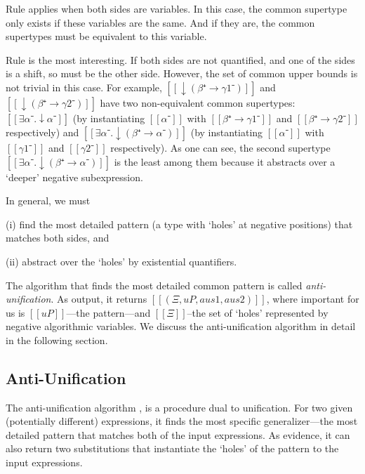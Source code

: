  Rule  applies when 
 both sides are variables. In this case,
 the common supertype only exists if these variables are 
 the same. And if they are, the common supertypes
 must be equivalent to this variable.

Rule  is the most 
interesting. If both sides are not quantified, and one of the sides is 
a shift, so must be the other side. 
However, the set of common upper bounds is not trivial in this case.
For example, $[[↓(β⁺ → γ1⁻)]]$ and $[[↓(β⁺ → γ2⁻)]]$ have
two non-equivalent common supertypes: 
$[[∃α⁻.↓α⁻]]$ 
(by instantiating $[[α⁻]]$ with $[[β⁺ → γ1⁻]]$ and $[[β⁺ → γ2⁻]]$ respectively)
and 
$[[∃α⁻.↓(β⁺ → α⁻)]]$ 
(by instantiating $[[α⁻]]$ with $[[γ1⁻]]$ and $[[γ2⁻]]$ respectively).
As one can see, the second supertype $[[∃α⁻.↓(β⁺ → α⁻)]]$ is the least among them
because it abstracts over a `deeper' negative subexpression.

In general, we must 
\begin{itemize*}
  \item[(i)] find the most detailed pattern (a type with `holes' at negative positions) 
    that matches both sides, and 
  \item[(ii)] abstract over the `holes' by existential quantifiers.
\end{itemize*}
The algorithm that finds the most detailed common pattern is called \emph{anti-unification}.
As output, it returns $[[(Ξ, uP, aus1, aus2)]]$, where important for us is
$[[uP]]$---the pattern---and $[[Ξ]]$--the set of `holes' represented by negative algorithmic variables.
We discuss the anti-unification algorithm in detail in the following section.


\subsection{Anti-Unification}
\label{sec:antiunification}

The anti-unification algorithm
\cite{plotkin1970:generalization,reynolds1970:transform}, is a procedure dual to
unification. For two given (potentially different) expressions, it finds the most
specific generalizer---the most detailed pattern that matches both of the input
expressions. As evidence, it can also return two substitutions that instantiate
the `holes' of the pattern to the input expressions.

